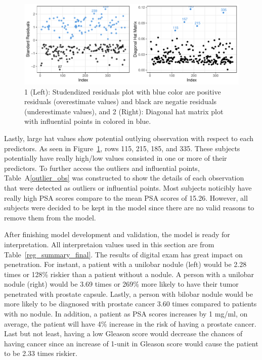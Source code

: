 \documentclass[11pt]{article}\usepackage[]{graphicx}\usepackage[]{color}
\makeatletter
\def\maxwidth{ %
  \ifdim\Gin@nat@width>\linewidth
    \linewidth
  \else
    \Gin@nat@width
  \fi
}
\makeatother
\begin{document}
\begin{figure}[h!] 
\begin{center}

\includegraphics[width=\maxwidth]{figure/unnamed-chunk-5-1} 

\caption{1 (Left): Studendized residuals plot with blue color are positive residuals (overestimate values) and black are negatie residuals (underestimate values), and 2 (Right): Diagonal hat matrix plot with influential points in colored in blue.}
\label{model_plot_2}
\end{center} 
\end{figure}

\noindent Lastly, large hat values show potential outlying observation with respect to each predictors. As seen in Figure~\ref{model_plot_2}, rows 115, 215, 185, and 335. These subjects potentially have really high/low values consisted in one or more of their predictors. To further access the outliers and influential points, Table~A\ref{outlier_obs} was constructed to show the details of each observation that were detected as outliers or influential points. Most subjects noticibly have really high PSA scores compare to the mean PSA scores of 15.26. However, all subjects were decided to be kept in the model since there are no valid reasons to remove them from the model.       
\hfill \break

\noindent After finishing model development and validation, the model is ready for interpretation. All interpretaion values used in this section are from Table~\ref{reg_summary_final}. The results of digital exam has great impact on penetration. For instant, a patient with a unilobar nodule (left) would be 2.28 times or 128\% riskier than a patient without a nodule. A person with a unilobar nodule (right) would be 3.69 times or 269\% more likely to have their tumor penetrated with prostate capsule. Lastly, a person with bilobar nodule would be more likely to be diagnosed with prostate cancer 3.60 times compared to patients with no nodule. In addition, a patient as PSA scores increases by 1 mg/ml, on average, the patient will have 4\% increase in the risk of having a prostate cancer. Last but not least, having a low Gleason score would decrease the chances of having cancer since an increase of 1-unit in Gleason score would cause the patient to be 2.33 times riskier.   
\hfill \break
\end{document}
